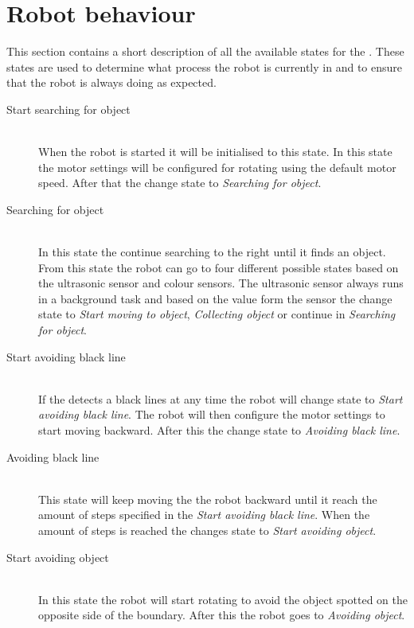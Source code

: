 \section{Robot behaviour} \label{sec:robot_behaviour}
This section contains a short description of all the available states for the \projname{}. These states are used to determine what process the robot is currently in and to ensure that the robot is always doing as expected.

\begin{description}
\item[Start searching for object] \hfill \\
When the robot is started it will be initialised to this state. In this state the motor settings will be configured for rotating using the default motor speed. After that the \projname{} change state to \emph{Searching for object}.

\item[Searching for object] \hfill \\
In this state the \projname{} continue searching to the right until it finds an object. From this state the robot can go to four different possible states based on the ultrasonic sensor and colour sensors. The ultrasonic sensor always runs in a background task and based on the value form the sensor the \projname{} change state to \emph{Start moving to object}, \emph{Collecting object} or continue in \emph{Searching for object}. 

\item[Start avoiding black line] \hfill \\
If the \projname{} detects a black lines at any time the robot will change state to \emph{Start avoiding black line}. The robot will then configure the motor settings to start moving backward. After this the \projname{} change state to \emph{Avoiding black line}. 

\item[Avoiding black line] \hfill \\
This state will keep moving the the robot backward until it reach the amount of steps specified in the \emph{Start avoiding black line}. When the amount of steps is reached the \projname{} changes state to \emph{Start avoiding object}.

\item[Start avoiding object] \hfill \\
In this state the robot will start rotating to avoid the object spotted on the opposite side of the boundary. After this the robot goes to \emph{Avoiding object}. 


\end{description}
